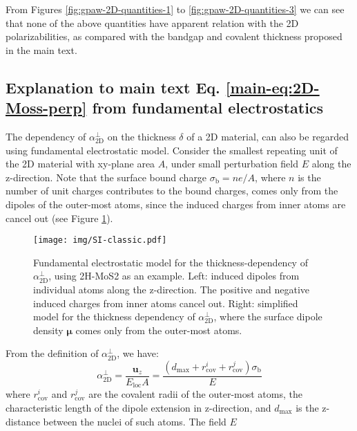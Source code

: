 \documentclass[manuscript=suppinfo,email=true,hyperref=true,keywords=false]{achemso}
\begin{document}
From Figures \ref{fig:gpaw-2D-quantities-1} to
\ref{fig:gpaw-2D-quantities-3} we can see that none of the above
quantities have apparent relation with the 2D polarizabilities, as
compared with the bandgap and covalent thickness proposed in the main
text. 



\subsection{Explanation to main text Eq. \ref{main-eq:2D-Moss-perp}
  from fundamental electrostatics}
\label{sssec:theory-3}

The dependency of $\alpha_{\mathrm{2D}}^{\perp}$ on the thickness
$\delta$ of a 2D material, can also be regarded using fundamental
electrostatic model. Consider the smallest repeating unit of the 2D
material with xy-plane area $A$, under small perturbation field $E$
along the z-direction.  Note that the surface bound charge
$\sigma_{\mathrm{b}}=n e /A$, where $n$ is the number of unit charges
contributes to the bound charges, comes only from the dipoles of the
outer-most atoms, since the induced charges from inner atoms are
cancel out (see Figure \ref{fig:classic-model}).
\begin{figure}[htbp]
  \centering
  \texttt{[image: img/SI-classic.pdf]}
  \caption{Fundamental electrostatic model for the
    thickness-dependency of $\alpha_{\mathrm{2D}}^{\perp}$, using 2H-MoS2 as an
    example. Left: induced dipoles from individual atoms along the
    z-direction. The positive and negative induced charges from inner
    atoms cancel out. Right: simplified model for the thickness
    dependency of $\alpha_{\mathrm{2D}}^{\perp}$, where the surface dipole density
    $\boldsymbol{\mu}$ comes only from the outer-most atoms.}
  \label{fig:classic-model}
\end{figure}
From the definition of
$\alpha_{\mathrm{2D}}^{\perp}$, we have:
\begin{equation}
  \label{eq:alpha-classic}
  \alpha_{\mathrm{2D}}^{\perp} = \frac{\boldsymbol{u}_{z}}{E_{\mathrm{loc}} A}
  = \frac{(d_{\mathrm{max}} + r_{\mathrm{cov}}^{i} + r_{\mathrm{cov}}^{j}) \sigma_{\mathrm{b}}}{E}
\end{equation}
where $r_{\mathrm{cov}}^{i}$ and $r_{\mathrm{cov}}^{j}$ are the
covalent radii of the outer-most atoms, the characteristic length of
the dipole extension in z-direction, and $d_{\mathrm{max}}$ is the
z-distance between the nuclei of such atoms.  The field $E$
\end{document}
